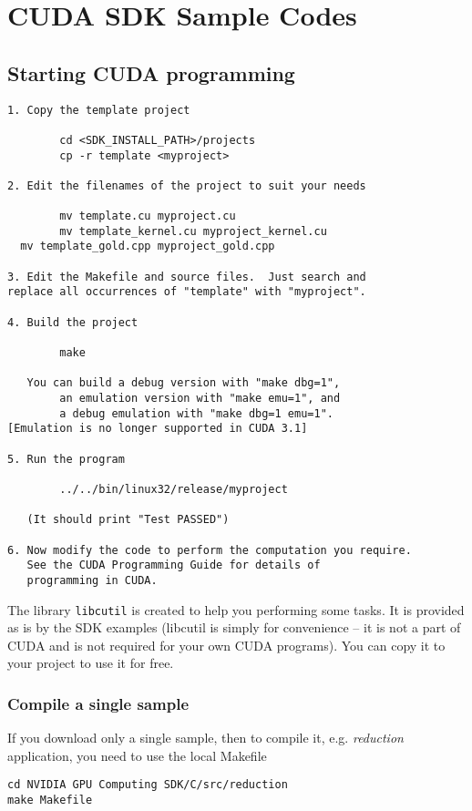 
\chapter{CUDA SDK Sample Codes}
\label{chap:cuda-sdk-sample}


\section{Starting CUDA programming}
\label{sec:start-cuda-progr}

\begin{verbatim}
1. Copy the template project

        cd <SDK_INSTALL_PATH>/projects
        cp -r template <myproject>

2. Edit the filenames of the project to suit your needs

        mv template.cu myproject.cu
        mv template_kernel.cu myproject_kernel.cu
  mv template_gold.cpp myproject_gold.cpp

3. Edit the Makefile and source files.  Just search and 
replace all occurrences of "template" with "myproject".

4. Build the project

        make

   You can build a debug version with "make dbg=1", 
        an emulation version with "make emu=1", and 
        a debug emulation with "make dbg=1 emu=1".
[Emulation is no longer supported in CUDA 3.1]

5. Run the program

        ../../bin/linux32/release/myproject

   (It should print "Test PASSED")

6. Now modify the code to perform the computation you require.  
   See the CUDA Programming Guide for details of 
   programming in CUDA.
\end{verbatim}

The library \verb!libcutil! is created to help you performing some
tasks. It is provided as is by the SDK examples (libcutil is simply
for convenience -- it is not a part of CUDA and is not required for
your own CUDA programs). You can copy it to your project to use it for
free.

\subsection{Compile a single sample}
\label{sec:comp-single-sample}

If you download only a single sample, then to compile it, e.g.
{\it reduction} application, you need to use the local Makefile
\begin{verbatim}
cd NVIDIA GPU Computing SDK/C/src/reduction
make Makefile
\end{verbatim}

